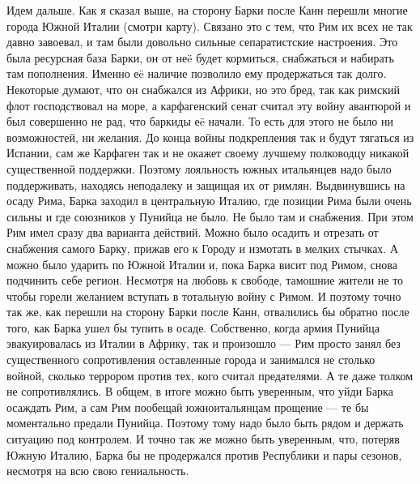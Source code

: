 Идем дальше. Как я сказал выше, на сторону Барки после Канн перешли многие города Южной Италии (смотри карту). Связано это с тем, что Рим их всех не так давно завоевал, и там были довольно сильные сепаратистские настроения. Это была ресурсная база Барки, он от неë будет кормиться, снабжаться и набирать там пополнения. Именно еë наличие позволило ему продержаться так долго. Некоторые думают, что он снабжался из Африки, но это бред, так как римский флот господствовал на море, а карфагенский сенат считал эту войну авантюрой и был совершенно не рад, что баркиды еë начали. То есть для этого не было ни возможностей, ни желания. До конца войны подкрепления так и будут тягаться из Испании, сам же Карфаген так и не окажет своему лучшему полководцу никакой существенной поддержки. Поэтому лояльность южных итальянцев надо было поддерживать, находясь неподалеку и защищая их от римлян. Выдвинувшись на осаду Рима, Барка заходил в центральную Италию, где позиции Рима были очень сильны и где союзников у Пунийца не было. Не было там и снабжения. При этом Рим имел сразу два варианта действий. Можно было осадить и отрезать от снабжения самого Барку, прижав его к Городу и измотать в мелких стычках. А можно было ударить по Южной Италии и, пока Барка висит под Римом, снова подчинить себе регион. Несмотря на любовь к свободе, тамошние жители не то чтобы горели желанием вступать в тотальную войну с Римом. И поэтому точно так же, как перешли на сторону Барки после Канн, отвалились бы обратно после того, как Барка ушел бы тупить в осаде. Собственно, когда армия Пунийца эвакуировалась из Италии в Африку, так и произошло — Рим просто занял без существенного сопротивления оставленные города и занимался не столько войной, сколько террором против тех, кого считал предателями. А те даже толком не сопротивлялись. В общем, в итоге можно быть уверенным, что уйди Барка осаждать Рим, а сам Рим пообещай южноитальянцам прощение — те бы моментально предали Пунийца. Поэтому тому надо было быть рядом и держать ситуацию под контролем. И точно так же можно быть уверенным, что, потеряв Южную Италию, Барка бы не продержался против Республики и пары сезонов, несмотря на всю свою гениальность.


